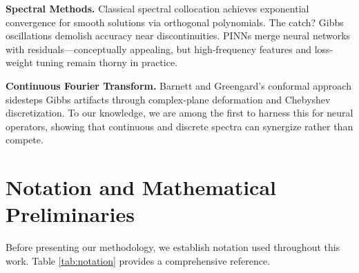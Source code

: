 \documentclass[11pt]{article}
\begin{document}
\textbf{Spectral Methods.} Classical spectral collocation \citep{boyd2001chebyshev,trefethen2019approximation} achieves exponential convergence for smooth solutions via orthogonal polynomials. The catch? Gibbs oscillations demolish accuracy near discontinuities. PINNs \citep{raissi2019physics,karniadakis2021physics} merge neural networks with residuals—conceptually appealing, but high-frequency features and loss-weight tuning remain thorny in practice.

\textbf{Continuous Fourier Transform.} Barnett and Greengard's conformal approach \citep{barnett2010conformal} sidesteps Gibbs artifacts through complex-plane deformation and Chebyshev discretization. To our knowledge, we are among the first to harness this for neural operators, showing that continuous and discrete spectra can synergize rather than compete.

\section{Notation and Mathematical Preliminaries}

Before presenting our methodology, we establish notation used throughout this work. Table \ref{tab:notation} provides a comprehensive reference.
\end{document}
